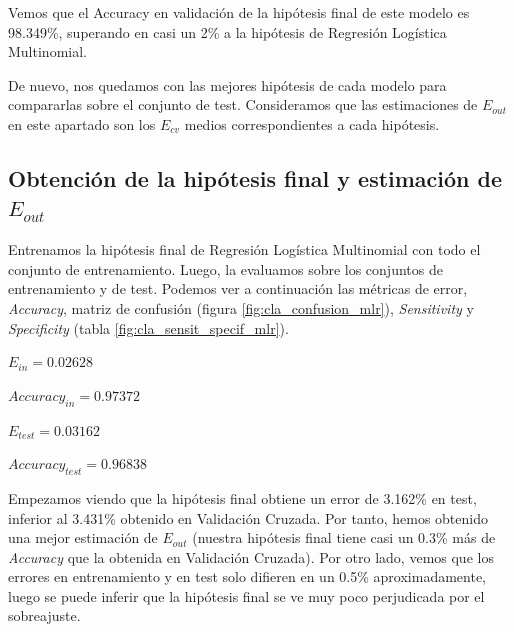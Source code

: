 \documentclass[10pt,a4paper]{article}
\begin{document}
Vemos que el Accuracy en validación de la hipótesis final de este modelo es 98.349\%, superando en casi un 2\% a la hipótesis de Regresión Logística Multinomial.

De nuevo, nos quedamos con las mejores hipótesis de cada modelo para compararlas sobre el conjunto de test. Consideramos que las estimaciones de $E_{out}$ en este apartado son los $E_{cv}$ medios correspondientes a cada hipótesis.





\subsection{Obtención de la hipótesis final y estimación de $E_{out}$}

Entrenamos la hipótesis final de Regresión Logística Multinomial con todo el conjunto de entrenamiento. Luego, la evaluamos sobre los conjuntos de entrenamiento y de test. Podemos ver a continuación las métricas de error, \textit{Accuracy}, matriz de confusión (figura \ref{fig:cla_confusion_mlr}), \textit{Sensitivity} y \textit{Specificity} (tabla \ref{fig:cla_sensit_specif_mlr}).

$E_{in} = 0.02628$

$Accuracy_{in} = 0.97372$

$E_{test} = 0.03162$

$Accuracy_{test} = 0.96838$

Empezamos viendo que la hipótesis final obtiene un error de 3.162\% en test, inferior al 3.431\% obtenido en Validación Cruzada. Por tanto, hemos obtenido una mejor estimación de $E_{out}$ (nuestra hipótesis final tiene casi un 0.3\% más de \textit{Accuracy} que la obtenida en Validación Cruzada). Por otro lado, vemos que los errores en entrenamiento y en test solo difieren en un 0.5\% aproximadamente, luego se puede inferir que la hipótesis final se ve muy poco perjudicada por el sobreajuste.
\end{document}
